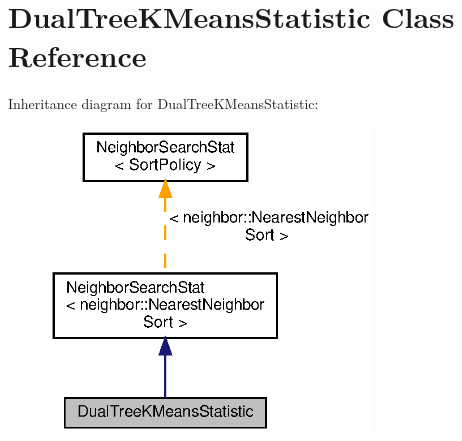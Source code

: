 \section{Dual\+Tree\+K\+Means\+Statistic Class Reference}
\label{classmlpack_1_1kmeans_1_1DualTreeKMeansStatistic}


Inheritance diagram for Dual\+Tree\+K\+Means\+Statistic\+:
\nopagebreak
\begin{figure}[H]
\begin{center}
\leavevmode
\includegraphics[width=244pt]{classmlpack_1_1kmeans_1_1DualTreeKMeansStatistic__inherit__graph}
\end{center}
\end{figure}
